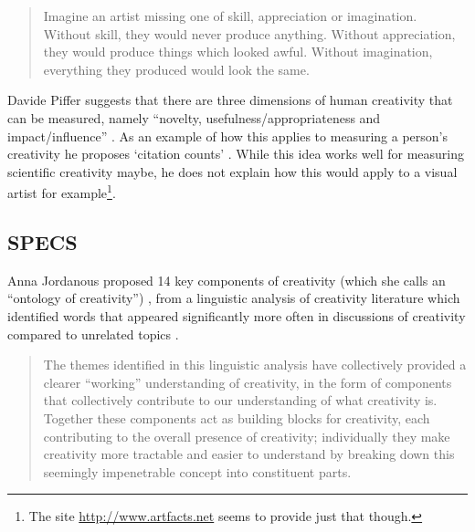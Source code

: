 \begin{quotation}
  Imagine an artist missing one of skill, appreciation or imagination. Without skill, they would never produce anything. Without appreciation, they would produce things which looked awful. Without imagination, everything they produced would look the same. 
\end{quotation}

\spirals

Davide Piffer suggests that there are three dimensions of human creativity that can be measured, namely ``novelty, usefulness/appropriateness and impact/influence'' \citeyear[p.258-259]{Piffer2012}. As an example of how this applies to measuring a person's creativity he proposes `citation counts' \autocite[p.261]{Piffer2012}. While this idea works well for measuring scientific creativity maybe, he does not explain how this would apply to a visual artist for example\footnote{The site \url{http://www.artfacts.net} seems to provide just that though.}.


\subsection{SPECS}
\label{s:specs}

Anna Jordanous proposed \num{14} key components of creativity (which she calls an ``ontology of creativity'') \citeyear[p.104-120]{Jordanous2012}, from a linguistic analysis of creativity literature which identified words that appeared significantly more often in discussions of creativity compared to unrelated topics \citeyear[p.120]{Jordanous2012}.

\begin{quotation}
  The themes identified in this linguistic analysis have collectively provided a clearer ``working'' understanding of creativity, in the form of components that collectively contribute to our understanding of what creativity is. Together these components act as building blocks for creativity, each contributing to the overall presence of creativity; individually they make creativity more tractable and easier to understand by breaking down this seemingly impenetrable concept into constituent parts. 
\end{quotation}

